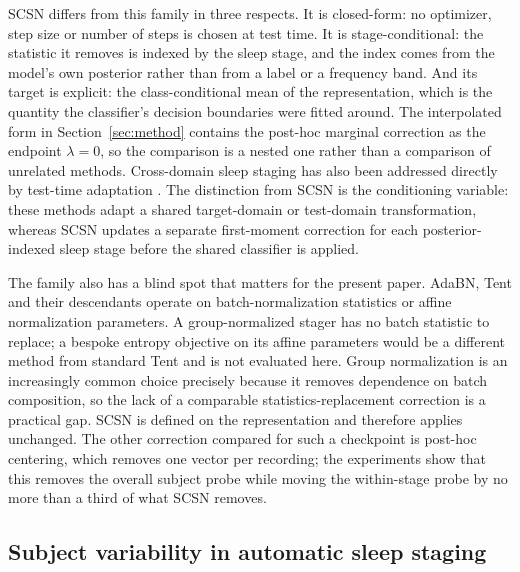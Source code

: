 SCSN differs from this family in three respects. It is closed-form: no
optimizer, step size or number of steps is chosen at test time. It is
stage-conditional: the statistic it removes is indexed by the sleep stage, and
the index comes from the model's own posterior rather than from a label or a
frequency band. And its target is explicit: the class-conditional mean of the
representation, which is the quantity the classifier's decision boundaries were
fitted around. The interpolated form in Section~\ref{sec:method} contains the
post-hoc marginal correction as the endpoint $\lambda=0$, so the comparison is
a nested one rather than a comparison of unrelated methods.
Cross-domain sleep staging has also been addressed directly by test-time
adaptation \citep{guo2025tta}. The distinction from SCSN is the conditioning
variable: these methods adapt a shared target-domain or test-domain
transformation, whereas SCSN updates a separate first-moment correction for
each posterior-indexed sleep stage before the shared classifier is applied.

The family also has a blind spot that matters for the present paper. AdaBN,
Tent and their descendants operate on batch-normalization statistics or
affine normalization parameters. A group-normalized stager has no batch
statistic to replace; a bespoke entropy objective on its affine parameters
would be a different method from standard Tent and is not evaluated here.
Group normalization is an increasingly common choice precisely because it
removes dependence on batch composition, so the lack of a comparable
statistics-replacement correction is a practical gap. SCSN is defined on the
representation and therefore applies unchanged. The other correction compared
for such a checkpoint is post-hoc centering, which
removes one vector per recording; the experiments show that this removes the
overall subject probe while moving the within-stage probe by no more than a
third of what SCSN removes.

\subsection{Subject variability in automatic sleep staging}

